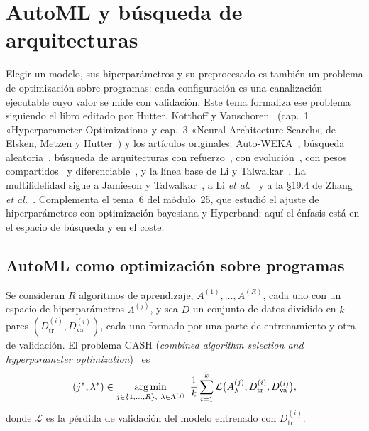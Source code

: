 \chapter{AutoML y búsqueda de arquitecturas}
\label{tema:3}

Elegir un modelo, sus hiperparámetros y su preprocesado es también un problema de optimización sobre programas: cada configuración es una canalización ejecutable cuyo valor se mide con validación. Este tema formaliza ese problema siguiendo el libro editado por Hutter, Kotthoff y Vanschoren~\cite{automl} (cap.~1 «Hyperparameter Optimization» y cap.~3 «Neural Architecture Search», de Elsken, Metzen y Hutter~\cite{elsken}) y los artículos originales: Auto-WEKA~\cite{autoweka}, búsqueda aleatoria~\cite{bergstra}, búsqueda de arquitecturas con refuerzo~\cite{zoph}, con evolución~\cite{real}, con pesos compartidos~\cite{enas} y diferenciable~\cite{darts}, y la línea base de Li y Talwalkar~\cite{lt}. La multifidelidad sigue a Jamieson y Talwalkar~\cite{sh}, a Li \emph{et al.}~\cite{hyperband} y a la §19.4 de Zhang \emph{et al.}~\cite{d2l}. Complementa el tema~6 del módulo~25, que estudió el ajuste de hiperparámetros con optimización bayesiana y Hyperband; aquí el énfasis está en el espacio de búsqueda y en el coste.

\section{AutoML como optimización sobre programas}

\begin{definicion}\label{def:cash}
Se consideran $R$ algoritmos de aprendizaje, $A^{(1)},\dots,A^{(R)}$, cada uno con un espacio de hiperparámetros $\Lambda^{(j)}$, y sea $D$ un conjunto de datos dividido en $k$ pares $(D^{(i)}_{\mathrm{tr}},D^{(i)}_{\mathrm{va}})$, cada uno formado por una parte de entrenamiento y otra de validación. El problema CASH (\emph{combined algorithm selection and hyperparameter optimization})~\cite{autoweka} es
\[
(j^{*},\lambda^{*})\in\argmin_{j\in\{1,\dots,R\},\ \lambda\in\Lambda^{(j)}}\ \frac1k\sum_{i=1}^{k}\mathcal{L}\bigl(A^{(j)}_{\lambda},D^{(i)}_{\mathrm{tr}},D^{(i)}_{\mathrm{va}}\bigr),
\]
donde $\mathcal{L}$ es la pérdida de validación del modelo entrenado con $D^{(i)}_{\mathrm{tr}}$.
\end{definicion}


